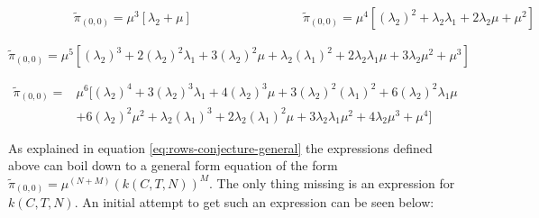 \begin{multicols}{2}
    \begin{figure}[H]
        \centering
        \scalebox{0.9}{
            }
    \end{figure}
    \columnbreak
    \begin{figure}[H]
        \centering
        \scalebox{0.9}{
            }
    \end{figure}
\end{multicols}
\vspace{-0.5cm}
\begin{alignat}{2} \label{eq:00_rate_1131}
    \hspace{4em} & \tilde{\pi}_{(0,0)} = \mu^3[\lambda_2 + \mu] \hspace{8em} & 
    \tilde{\pi}_{(0,0)} = \mu^4[(\lambda_2)^2 + \lambda_2 \lambda_1 + 2\lambda_2 
    \mu + \mu^2] 
\end{alignat}


\begin{figure}[h]
    \centering
    \scalebox{0.8}{
        }
\end{figure}
\begin{equation}\label{eq:00_rate_1141}
    \tilde{\pi}_{(0,0)} = \mu^5[(\lambda_2)^3 + 2(\lambda_2)^2 \lambda_1 + 
    3(\lambda_2)^2 \mu + \lambda_2 (\lambda_1)^2 + 2\lambda_2 \lambda_1 \mu + 
    3\lambda_2 \mu^2 + \mu^3]
\end{equation}

\begin{figure}[h]
    \centering
    \scalebox{0.8}{
        }
\end{figure}
\begin{align}\label{eq:00_rate_1151}
    \tilde{\pi}_{(0,0)} =& \mu^6[(\lambda_2)^4 + 3(\lambda_2)^3 \lambda_1 + 
    4(\lambda_2)^3 \mu + 3(\lambda_2)^2 (\lambda_1)^2 + 
    6(\lambda_2)^2 \lambda_1 \mu \\
    & + 6(\lambda_2)^2 \mu^2 + \lambda_2 (\lambda_1)^3 + 
    2\lambda_2 (\lambda_1)^2 \mu + 3\lambda_2 \lambda_1 \mu^2 + 
    4\lambda_2 \mu^3 + \mu^4] \nonumber
\end{align}

\newpage
As explained in equation \ref{eq:rows-conjecture-general} the expressions defined 
above can boil down to a general form equation of the form 
\(\tilde{\pi}_{(0,0)} = \mu^{(N+M)} (k(C,T,N))^M\). 
The only thing missing is an expression for \(k(C,T,N)\). 
An initial attempt to get such an expression can be seen below:

